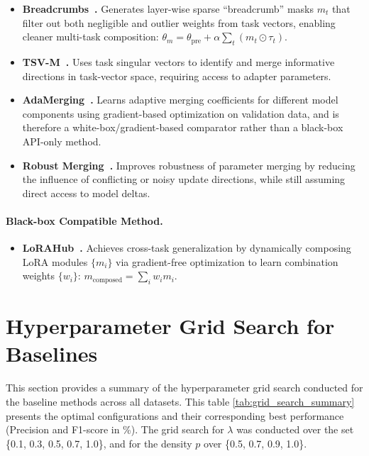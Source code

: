 \begin{itemize}[leftmargin=*, align=left]
    \item \textbf{Breadcrumbs~\cite{davari2024modelbreadcrumbsscalingmultitask}.} 
    Generates layer-wise sparse “breadcrumb” masks $m_t$ that filter out both negligible and outlier weights from task vectors, enabling cleaner multi-task composition:
    $\theta_m = \theta_{\text{pre}} + \alpha \sum_t (m_t \odot \tau_t)$.

    \item \textbf{TSV-M~\cite{chen2024tsvm}.}
    Uses task singular vectors to identify and merge informative directions in task-vector space, requiring access to adapter parameters.

    \item \textbf{AdaMerging~\cite{yang2023adamerging}.}
    Learns adaptive merging coefficients for different model components using gradient-based optimization on validation data, and is therefore a white-box/gradient-based comparator rather than a black-box API-only method.

    \item \textbf{Robust Merging~\cite{li2024robustmerging}.}
    Improves robustness of parameter merging by reducing the influence of conflicting or noisy update directions, while still assuming direct access to model deltas.
\end{itemize}

\paragraph{Black-box Compatible Method.}
\begin{itemize}[leftmargin=*, align=left]
    \item \textbf{LoRAHub~\cite{huang2024lorahubefficientcrosstaskgeneralization}.} 
    Achieves cross-task generalization by dynamically composing LoRA modules $\{m_i\}$ via gradient-free optimization to learn combination weights $\{w_i\}$: $m_{\text{composed}} = \sum_i w_i m_i$.
\end{itemize}



\section{Hyperparameter Grid Search for Baselines}
\label{sec:appendix_hyperparams}

This section provides a summary of the hyperparameter grid search conducted for the baseline methods across all datasets. 
This table \ref{tab:grid_search_summary} presents the optimal configurations and their corresponding best performance (Precision and F1-score in \%). The grid search for $\lambda$ was conducted over the set \{0.1, 0.3, 0.5, 0.7, 1.0\}, and for the density $p$ over \{0.5, 0.7, 0.9, 1.0\}. 




